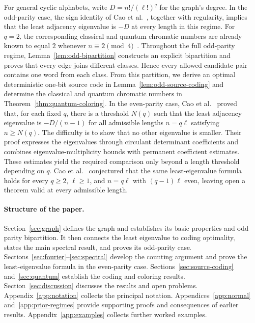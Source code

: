 \documentclass[11pt,a4paper]{article}
\numberwithin{equation}{section}
\numberwithin{figure}{section}
\numberwithin{table}{section}
\numberwithin{footnote}{section}
\theoremstyle{informal}\newtheorem*{informaltheorem}{Informal theorem}
\theoremstyle{definition}\newtheorem{example}{Example}[section]
\theoremstyle{remark}\newtheorem{remark}[theorem]{Remark}
\begin{document}
For general cyclic alphabets, write \(D=n!/(\ell!)^q\) for the
graph's degree. In the odd-parity case, the sign identity of
Cao et al.~\cite[Lemma~4.3]{cao}, together with regularity, implies
that the least adjacency eigenvalue is \(-D\) at every length in
this regime. For \(q=2\), the corresponding classical and quantum
chromatic numbers are already known to equal \(2\) whenever
\(n\equiv2\pmod4\)~\cite[Sec.~2]{lnz}.
Throughout the full odd-parity regime,
Lemma~\ref{lem:odd-bipartition} constructs an explicit bipartition
and proves that every edge joins different classes. Hence every
allowed candidate pair contains one word from each class. From this
partition, we derive an optimal deterministic one-bit source code in
Lemma~\ref{lem:odd-source-coding} and determine the classical
and quantum chromatic numbers in Theorem~\ref{thm:quantum-coloring}.
In the even-parity case, Cao et al.~\cite[Lemma~4.4]{cao}
proved that, for each fixed \(q\), there is a threshold \(N(q)\)
such that the least adjacency eigenvalue is \(-D/(n-1)\) for all
admissible lengths \(n=q\ell\) satisfying \(n\geq N(q)\).
The difficulty is to show that no other eigenvalue is smaller.
Their proof expresses the eigenvalues through circulant determinant
coefficients and combines eigenvalue-multiplicity bounds with
permanent coefficient estimates. These estimates yield the required
comparison only beyond a length threshold depending on \(q\).
Cao et al.~\cite[Conjecture~6.3]{cao} conjectured that the same
least-eigenvalue formula holds for every \(q\geq2\), \(\ell\geq1\),
and \(n=q\ell\) with \((q-1)\ell\) even, leaving open a theorem
valid at every admissible length.

\paragraph{Structure of the paper.}
Section~\ref{sec:graph} defines the graph and establishes its basic
properties and odd-parity bipartition. It then connects the least
eigenvalue to coding optimality, states the main spectral result,
and proves its odd-parity case.
Sections~\ref{sec:fourier}--\ref{sec:spectral} develop the counting
argument and prove the least-eigenvalue formula in the even-parity case.
Sections~\ref{sec:source-coding} and~\ref{sec:quantum} establish the
coding and coloring results. Section~\ref{sec:discussion} discusses the results
and open problems. Appendix~\ref{app:notation} collects the principal
notation. Appendices~\ref{app:normal} and~\ref{app:prior-regimes}
provide supporting proofs and consequences of earlier results.
Appendix~\ref{app:examples} collects further worked examples.
\end{document}

